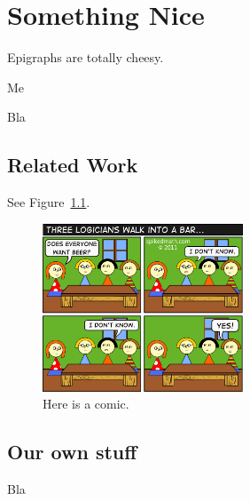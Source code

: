 
\chapter{Something Nice}\label{chapter:nice}

\setlength{\epigraphwidth}{10cm}
\epigraph{Epigraphs are totally cheesy.}{Me}

\noindent
Bla %

\section{Related Work}

See Figure~\ref{fig:comic}.

\begin{figure}
  \centering
  \includegraphics[height=5cm]{img/spikedmath-445-three-logicians-walk-into-a-bar.png}
  \caption{Here is a comic.}\label{fig:comic}
\end{figure}

\section{Our own stuff}

Bla %
